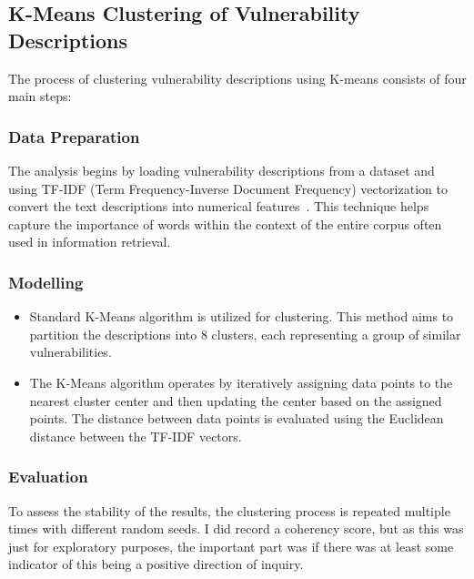 \documentclass[12pt]{article}
\begin{document}
\subsection{K-Means Clustering of Vulnerability Descriptions}

The process of clustering vulnerability descriptions using K-means consists of four main steps:

\subsubsection{Data Preparation}

The analysis begins by loading vulnerability descriptions from a dataset and using TF-IDF
(Term Frequency-Inverse Document Frequency) vectorization to convert the text
descriptions into numerical features~\cite{tfidf}. This technique helps capture the
importance of words within the context of the entire corpus often used in information
retrieval.


\subsubsection{Modelling}

\begin{itemize}

	\item Standard K-Means algorithm is utilized for clustering. This method aims to partition the
	      descriptions into 8 clusters, each representing a group of similar
	      vulnerabilities.

	\item The K-Means algorithm operates by iteratively assigning data points to the nearest cluster
	      center and then updating the center based on the assigned points. The distance between
	      data points is evaluated using the Euclidean distance between the TF-IDF vectors.

\end{itemize}

\subsubsection{Evaluation}


To assess the stability of the results, the clustering process is repeated multiple times
with different random seeds. I did record a coherency score, but as this was just for exploratory
purposes, the important part was if there was at least some indicator of this being a positive
direction of inquiry.
\end{document}
